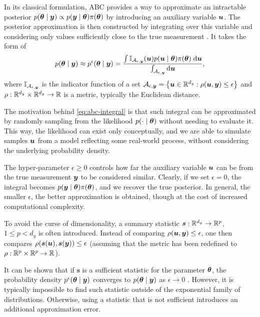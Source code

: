 In its classical formulation, ABC provides a way to approximate an intractable posterior ${p(\bm{\theta} \mid \bm{y}) \propto p(\bm{y} \mid \bm{\theta}) \pi(\bm{\theta})}$ by introducing an auxiliary variable $\bm{u}$. The posterior approximation is then constructed by integrating over this variable and considering only values sufficiently close to the true measurement \citep{jasra-filtering}. It takes the form of
\begin{equation} \label{eq:abc-integral}
p(\bm{\theta} \mid \bm{y}) \approx p^\epsilon(\bm{\theta} \mid \bm{y}) = \frac{\int \mathbb{I}_{\mathcal{A}_{\epsilon, \bm{y}}}(\bm{u}) p(\bm{u} \mid \bm{\theta}) \pi(\bm{\theta}) \; \mathrm{d}{\bm{u}}}{\int_{\mathcal{A}_{\epsilon, \bm{y}}} \mathrm{d}{\bm{u}}},
\end{equation}
where $\mathbb{I}_{\mathcal{A}_{\epsilon, \bm{y}}}$ is the indicator function of a set $\mathcal{A}_{\epsilon, \bm{y}} = \left\{\bm{u} \in \mathbb{R}^{d_y} : \rho(\bm{u}, \bm{y}) \leq \epsilon \right\}$ and $\rho: \mathbb{R}^{d_y} \times \mathbb{R}^{d_y} \to \mathbb{R}$ is a metric, typically the Euclidean distance.

The motivation behind \eqref{eq:abc-integral} is that such integral can be approximated by randomly sampling from the likelihood $p(\cdot \mid \bm{\theta})$ without needing to evaluate it. This way, the likelihood can exist only conceptually, and we are able to simulate samples $\bm{u}$ from a model reflecting some real-world process, without considering the underlying probability density.

The hyper-parameter $\epsilon \geq 0$ controls how far the auxiliary variable $\bm{u}$ can be from the true measurement $\bm{y}$ to be considered similar. Clearly, if we set $\epsilon = 0$, the integral becomes $p(\bm{y} \mid \bm{\theta}) \pi(\bm{\theta})$, and we recover the true posterior. In general, the smaller $\epsilon$, the better approximation is obtained, though at the cost of increased computational complexity.

To avoid the curse of dimensionality, a summary statistic $\bm{s}: \mathbb{R}^{d_y} \to \mathbb{R}^p$, $1 \leq p < d_y$ is often introduced. Instead of comparing $\rho(\bm{u}, \bm{y}) \leq \epsilon$, one then compares $\rho(\bm{s}(\bm{u}), \bm{s}(\bm{y})) \leq \epsilon$ (assuming that the metric has been redefined to $\rho: \mathbb{R}^p \times \mathbb{R}^p \to \mathbb{R}$).

It can be shown that if $\bm{s}$ is a sufficient statistic for the parameter $\bm{\theta}$, the probability density $p^\epsilon(\bm{\theta} \mid \bm{y})$ converges to $p(\bm{\theta} \mid \bm{y})$ as $\epsilon \to 0$ \citep{jasra-time-series}. However, it is typically impossible to find such statistic outside of the exponential family of distributions. Otherwise, using a statistic that is not sufficient introduces an additional approximation error.

